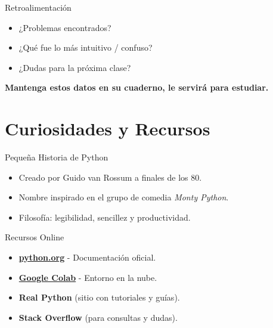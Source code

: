 \documentclass[10pt]{beamer}
\begin{document}
\begin{frame}{Retroalimentación}
  \begin{itemize}
    \item ¿Problemas encontrados?
    \item ¿Qué fue lo más intuitivo / confuso?
    \item ¿Dudas para la próxima clase?
  \end{itemize}
  \vspace{0.3cm}
  \textbf{Mantenga estos datos en su cuaderno, le servirá para estudiar.}
\end{frame}

\section{Curiosidades y Recursos}

\begin{frame}{Pequeña Historia de Python}
  \begin{itemize}
    \item Creado por Guido van Rossum a finales de los 80.
    \item Nombre inspirado en el grupo de comedia \emph{Monty Python}.
    \item Filosofía: legibilidad, sencillez y productividad.
  \end{itemize}
\end{frame}

\begin{frame}{Recursos Online}
  \begin{itemize}
    \item \href{https://www.python.org}{\textbf{python.org}} - Documentación oficial.
    \item \href{https://colab.research.google.com}{\textbf{Google Colab}} - Entorno en la nube.
    \item \textbf{Real Python} (sitio con tutoriales y guías).
    \item \textbf{Stack Overflow} (para consultas y dudas).
  \end{itemize}
\end{frame}
\end{document}
